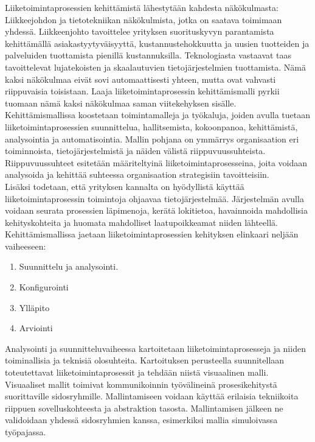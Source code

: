 \documentclass[finnish,12pt,a4paper,pdftex]{article}
\begin{document}
Liiketoimintaprosessien kehittämistä lähestytään kahdesta näkökulmasta: Liikkeejohdon ja tietotekniikan näkökulmista, jotka on saatava toimimaan yhdessä. Liikkeenjohto tavoittelee yrityksen suorituskyvyn parantamista kehittämällä asiakastyytyväisyyttä, kustannustehokkuutta ja uusien tuotteiden ja palveluiden tuottamista pienillä kustannuksilla. Teknologiasta vastaavat taas tavoittelevat lujatekoisten ja skaalautuvien tietojärjestelmien tuottamista. Nämä kaksi näkökulmaa eivät sovi automaattisesti yhteen, mutta ovat vahvasti riippuvaisia toisistaan. Laaja liiketoimintaprosessin kehittämismalli pyrkii tuomaan nämä kaksi näkökulmaa saman viitekehyksen sisälle. \citep{weske}\\

Kehittämismallissa koostetaan toimintamalleja ja työkaluja, joiden avulla tuetaan liiketoimintaprosessien suunnittelua, hallitsemista, kokoonpanoa, kehittämistä, analysointia ja automatisointia. Mallin pohjana on ymmärrys organisaation eri toiminnoista, tietojärjestelmistä ja näiden välistä riippuvuussuhteista. Riippuvuussuhteet esitetään määriteltyinä liiketoimintaprosesseina, joita voidaan analysoida ja kehittää suhteessa organisaation strategisiin tavoitteisiin. \citep{weske}\\

Lisäksi todetaan, että yrityksen kannalta on hyödyllistä käyttää liiketoimintaprosessin toimintoja ohjaavaa tietojärjestelmää. Järjestelmän avulla voidaan seurata prosessien läpimenoja, kerätä lokitietoa, havainnoida mahdollisia kehityskohteita ja huomata mahdolliset laatupoikkeamat niiden lähteellä. \citep{weske}\\

Kehittämismallissa jaetaan liiketoimintaprosessien kehityksen elinkaari neljään vaiheeseen:

\begin{enumerate}
\setlength{\itemsep}{0pt}
    \item Suunnittelu ja analysointi.
    \item Konfigurointi
    \item Ylläpito
    \item Arviointi
\end{enumerate}

Analysointi ja suunnitteluvaiheessa kartoitetaan liiketoimintaprosesseja ja niiden toiminallisia ja teknisiä olosuhteita. Kartoituksen perusteella suunnitellaan toteutettavat liiketoimintaprosessit ja tehdään niistä visuaalinen malli. Visuaaliset mallit toimivat kommunikoinnin työvälineinä prosesikehitystä suorittaville sidosryhmille. Mallintamiseen voidaan käyttää erilaisia tekniikoita riippuen sovelluskohteesta ja abstraktion tasosta. Mallintamisen jälkeen ne validoidaan yhdessä sidosryhmien kanssa, esimerkiksi mallia simuloivassa työpajassa. \\
\end{document}
